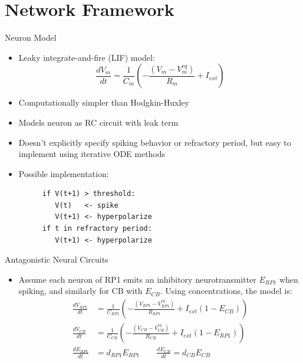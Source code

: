 \documentclass[leqno,presentation,unknownkeysallowed]{beamer}
\begin{document}
\section{Network Framework}

\begin{frame}[fragile]{Neuron Model}
\begin{itemize}
\item Leaky integrate-and-fire (LIF) model:
\begin{equation*}
\frac{dV_{m}}{dt}=\frac{1}{C_{m}}\left(-\frac{(V_{m}-V_{m}^{eq})}{R_{m}}+I_{ext}\right)
\end{equation*}
\item Computationally simpler than Hodgkin-Huxley
\item Models neuron as RC circuit with leak term
\item Doesn't explicitly specify spiking behavior or refractory period, but easy to implement using iterative ODE methods
\item Possible implementation:
\begin{figure}
\begin{BVerbatim}[fontsize=\scriptsize]
if V(t+1) > threshold:
   V(t)   <- spike
   V(t+1) <- hyperpolarize
if t in refractory period:
   V(t+1) <- hyperpolarize
\end{BVerbatim}
\end{figure}
\end{itemize}
\end{frame}

\begin{frame}{Antagonistic Neural Circuits}
\begin{itemize}
\item Assume each neuron of RP1 emits an inhibitory neurotransmitter $E_{RP1}$ when spiking, and similarly for CB with $E_{CB}$. Using concentrations, the model is:
\begin{align*}
\frac{dV_{RP1}}{dt}&=\frac{1}{C_{RP1}}\left(-\frac{(V_{RP1}-V_{RP1}^{eq})}{R_{RP1}}+I_{ext}\left(1-E_{CB}\right)\right)\\
\frac{dV_{CB}}{dt}&=\frac{1}{C_{CB}}\left(-\frac{(V_{CB}-V_{CB}^{eq})}{R_{CB}}+I_{ext}\left(1-E_{RP1}\right)\right)\\
\frac{dE_{RP1}}{dt}&=d_{RP1}E_{RP1}\hspace{2em}\frac{dE_{CB}}{dt}=d_{CB}E_{CB}
\end{align*}
\end{itemize}
\end{frame}
\end{document}
